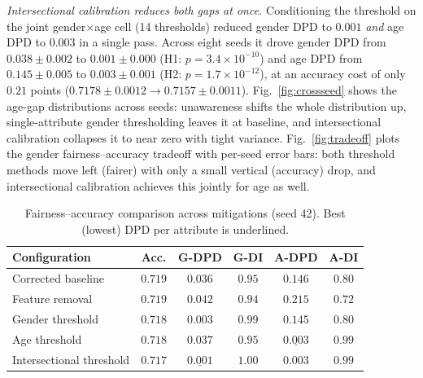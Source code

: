 \documentclass[conference]{IEEEtran}
\begin{document}
\textit{Intersectional calibration reduces both gaps at once.} Conditioning the threshold
on the joint gender$\times$age cell (14 thresholds) reduced gender DPD to $0.001$
\emph{and} age DPD to $0.003$ in a single pass. Across eight seeds it drove gender DPD from
$0.038\pm0.002$ to $0.001\pm0.000$ (H1: $p=3.4\times10^{-10}$) and age DPD from
$0.145\pm0.005$ to $0.003\pm0.001$ (H2: $p=1.7\times10^{-12}$), at an accuracy cost of only
$0.21$ points ($0.7178\pm0.0012\rightarrow0.7157\pm0.0011$). Fig.~\ref{fig:crossseed}
shows the age-gap distributions across seeds: unawareness shifts the whole distribution
up, single-attribute gender thresholding leaves it at baseline, and intersectional
calibration collapses it to near zero with tight variance. Fig.~\ref{fig:tradeoff} plots
the gender fairness--accuracy tradeoff with per-seed error bars: both threshold methods
move left (fairer) with only a small vertical (accuracy) drop, and intersectional
calibration achieves this jointly for age as well.

\begin{table}[t]
\caption{Fairness--accuracy comparison across mitigations (seed 42). Best (lowest) DPD
per attribute is underlined.}
\label{tab:mitigation}
\centering
\setlength{\tabcolsep}{4pt}
\begin{tabular}{lccccc}
\toprule
Configuration & Acc. & G-DPD & G-DI & A-DPD & A-DI \\
\midrule
Corrected baseline        & $0.719$ & $0.036$ & $0.95$ & $0.146$ & $0.80$ \\
Feature removal           & $0.719$ & $0.042$ & $0.94$ & $0.215$ & $0.72$ \\
Gender threshold          & $0.718$ & $0.003$ & $0.99$ & $0.145$ & $0.80$ \\
Age threshold             & $0.718$ & $0.037$ & $0.95$ & $\underline{0.003}$ & $0.99$ \\
Intersectional threshold  & $0.717$ & $\underline{0.001}$ & $1.00$ & $0.003$ & $0.99$ \\
\bottomrule
\end{tabular}
\end{table}
\end{document}
